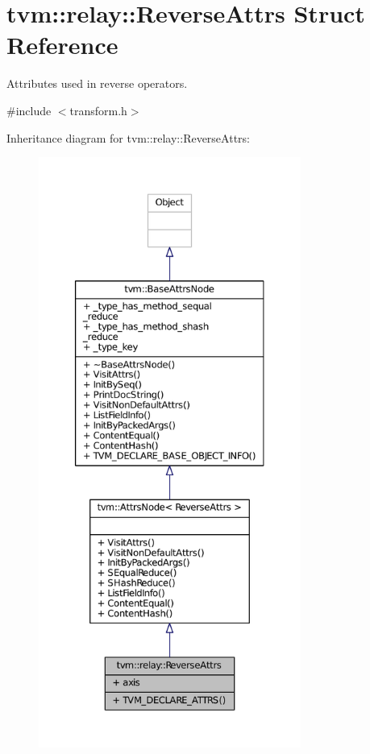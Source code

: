 \hypertarget{structtvm_1_1relay_1_1ReverseAttrs}{}\section{tvm\+:\+:relay\+:\+:Reverse\+Attrs Struct Reference}
\label{structtvm_1_1relay_1_1ReverseAttrs}


Attributes used in reverse operators.  




{\ttfamily \#include $<$transform.\+h$>$}



Inheritance diagram for tvm\+:\+:relay\+:\+:Reverse\+Attrs\+:
\nopagebreak
\begin{figure}[H]
\begin{center}
\leavevmode
\includegraphics[height=550pt]{structtvm_1_1relay_1_1ReverseAttrs__inherit__graph}
\end{center}
\end{figure}


